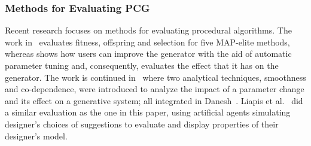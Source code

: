 
\subsubsection{Methods for Evaluating PCG}

Recent research %
focuses on methods for evaluating procedural algorithms. The work in~ %
evaluates fitness, offspring and selection for five MAP-elite methods, whereas %
 shows how users can improve the generator with the aid of automatic parameter tuning and, consequently, evaluates the effect that it has on the generator. The work is continued in~ where two analytical techniques, smoothness and co-dependence, were introduced to analyze the impact of a parameter change and its %
effect on a generative system; all integrated in Danesh~. Liapis et al.~ did a similar evaluation as the one in this paper, using artificial agents simulating designer's choices of suggestions to evaluate and display properties of their designer's model.%

